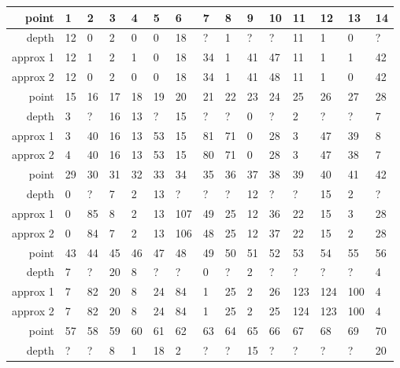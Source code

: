 \begin{center}
  \tablefirsthead{\hline}
  \tablelasttail{\hline}
  \begin{supertabular}{|r|l l l l l l l l l l l l l l|}
\hline
point & 1 & 2 & 3 & 4 & 5 & 6 & 7 & 8 & 9 & 10 & 11 & 12 & 13 & 14 \\
\hline
depth & 12 & 0 & 2 & 0 & 0 & 18 & ? & 1 & ? & ? & 11 & 1 & 0 & ? \\
approx 1 & 12 & 1 & 2 & 1 & 0 & 18 & 34 & 1 & 41 & 47 & 11 & 1 & 1 & 42 \\
approx 2 & 12 & 0 & 2 & 0 & 0 & 18 & 34 & 1 & 41 & 48 & 11 & 1 & 0 & 42 \\
\hline
point & 15 & 16 & 17 & 18 & 19 & 20 & 21 & 22 & 23 & 24 & 25 & 26 & 27 & 28 \\
\hline
depth & 3 & ? & 16 & 13 & ? & 15 & ? & ? & 0 & ? & 2 & ? & ? & 7 \\
approx 1 & 3 & 40 & 16 & 13 & 53 & 15 & 81 & 71 & 0 & 28 & 3 & 47 & 39 & 8 \\
approx 2 & 4 & 40 & 16 & 13 & 53 & 15 & 80 & 71 & 0 & 28 & 3 & 47 & 38 & 7 \\
\hline
point & 29 & 30 & 31 & 32 & 33 & 34 & 35 & 36 & 37 & 38 & 39 & 40 & 41 & 42 \\
\hline
depth & 0 & ? & 7 & 2 & 13 & ? & ? & ? & 12 & ? & ? & 15 & 2 & ? \\
approx 1 & 0 & 85 & 8 & 2 & 13 & 107 & 49 & 25 & 12 & 36 & 22 & 15 & 3 & 28 \\
approx 2 & 0 & 84 & 7 & 2 & 13 & 106 & 48 & 25 & 12 & 37 & 22 & 15 & 2 & 28 \\
\hline
point & 43 & 44 & 45 & 46 & 47 & 48 & 49 & 50 & 51 & 52 & 53 & 54 & 55 & 56 \\
\hline
depth & 7 & ? & 20 & 8 & ? & ? & 0 & ? & 2 & ? & ? & ? & ? & 4 \\
approx 1 & 7 & 82 & 20 & 8 & 24 & 84 & 1 & 25 & 2 & 26 & 123 & 124 & 100 & 4 \\
approx 2 & 7 & 82 & 20 & 8 & 24 & 84 & 1 & 25 & 2 & 25 & 124 & 123 & 100 & 4 \\
\hline
point & 57 & 58 & 59 & 60 & 61 & 62 & 63 & 64 & 65 & 66 & 67 & 68 & 69 & 70 \\
\hline
depth & ? & ? & 8 & 1 & 18 & 2 & ? & ? & 15 & ? & ? & ? & ? & 20 \\

\end{supertabular}
\end{center}
